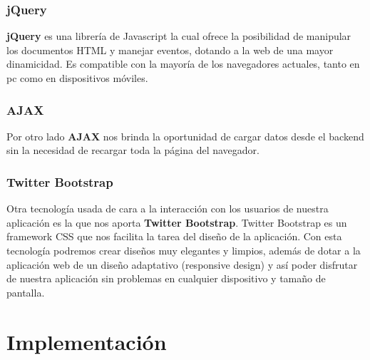 \hfill\begin{minipage}{\dimexpr\textwidth-1cm}
	\subsubsection{jQuery}
	\textbf{jQuery} es una librería de Javascript la cual ofrece la posibilidad de manipular los documentos HTML y manejar eventos, dotando a la web de una mayor dinamicidad. Es compatible con la mayoría de los navegadores actuales, tanto en pc como en dispositivos móviles. \\
\end{minipage}

\hfill\begin{minipage}{\dimexpr\textwidth-1cm}
	\subsubsection{AJAX}
	Por otro lado \textbf{AJAX} nos brinda la oportunidad de cargar datos desde el backend sin la necesidad de recargar toda la página del navegador. \\
\end{minipage}

\hfill\begin{minipage}{\dimexpr\textwidth-1cm}
	\subsubsection{Twitter Bootstrap}
	Otra tecnología usada de cara a la interacción con los usuarios de nuestra aplicación es la que nos aporta \textbf{Twitter Bootstrap}. Twitter Bootstrap es un framework CSS que nos facilita la tarea del diseño de la aplicación. Con esta tecnología podremos crear diseños muy elegantes y limpios, además de dotar a la aplicación web de un diseño adaptativo (responsive design) y así poder disfrutar de nuestra aplicación sin problemas en cualquier dispositivo y tamaño de pantalla. \\
\end{minipage}

\newpage
\section{Implementación}

\newpage

